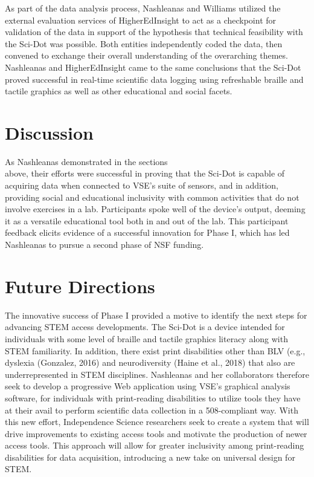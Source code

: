 \documentclass[11.5pt]{sig-alternate}
\begin{document}
\begin{large}
As part of the data analysis process, Nashleanas and Williams utilized the external evaluation services of HigherEdInsight to act as a checkpoint for validation of the data in support of the hypothesis that technical feasibility with the Sci-Dot was possible. Both entities independently coded the data, then convened to exchange their overall understanding of the overarching themes. Nashleanas and HigherEdInsight came to the same conclusions that the Sci-Dot proved successful in real-time scientific data logging using refreshable braille and tactile graphics as well as other educational and social facets.

\section*{Discussion}
As Nashleanas demonstrated in the sections \\above, their efforts were successful in proving that the Sci-Dot is capable of acquiring data when connected to VSE’s suite of sensors, and in addition, providing social and educational inclusivity with common activities that do not involve exercises in a lab. Participants spoke well of the device’s output, deeming it as a versatile educational tool both in and out of the lab. This participant feedback elicits evidence of a successful innovation for Phase I, which has led Nashleanas to pursue a second phase of NSF funding.

\section*{Future Directions}
The innovative success of Phase I provided a motive to identify the next steps for advancing STEM access developments. The Sci-Dot is a device intended for individuals with some level of braille and tactile graphics literacy along with STEM familiarity. In addition, there exist print disabilities other than BLV (e.g., dyslexia (Gonzalez, 2016) and neurodiversity (Haine et al., 2018) that also are underrepresented in STEM disciplines. Nashleanas and her collaborators therefore seek to develop a progressive Web application using VSE’s graphical analysis software, for individuals with print-reading disabilities to utilize tools they have at their avail to perform scientific data collection in a 508-compliant way. With this new effort, Independence Science researchers seek to create a system that will drive improvements to existing access tools and motivate the production of newer access tools. This approach will allow for greater inclusivity among print-reading disabilities for data acquisition, introducing a new take on universal design for STEM.

\end{large}
\end{document}
